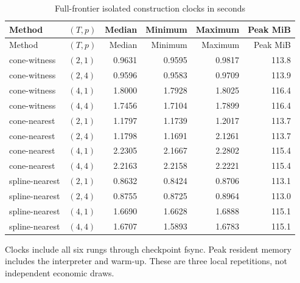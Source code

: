 \begin{longtable}{llrrrr}
\caption{Full-frontier isolated construction clocks in seconds}\label{tab:witnesstime46}\\
\toprule Method & $(T,p)$ & Median & Minimum & Maximum & Peak MiB \\ \midrule\endfirsthead
\toprule Method & $(T,p)$ & Median & Minimum & Maximum & Peak MiB \\ \midrule\endhead
cone-witness & $(2,1)$ & 0.9631 & 0.9595 & 0.9817 & 113.8 \\
cone-witness & $(2,4)$ & 0.9596 & 0.9583 & 0.9709 & 113.9 \\
cone-witness & $(4,1)$ & 1.8000 & 1.7928 & 1.8025 & 116.4 \\
cone-witness & $(4,4)$ & 1.7456 & 1.7104 & 1.7899 & 116.4 \\
cone-nearest & $(2,1)$ & 1.1797 & 1.1739 & 1.2017 & 113.7 \\
cone-nearest & $(2,4)$ & 1.1798 & 1.1691 & 2.1261 & 113.7 \\
cone-nearest & $(4,1)$ & 2.2305 & 2.1667 & 2.2802 & 115.4 \\
cone-nearest & $(4,4)$ & 2.2163 & 2.2158 & 2.2221 & 115.4 \\
spline-nearest & $(2,1)$ & 0.8632 & 0.8424 & 0.8706 & 113.1 \\
spline-nearest & $(2,4)$ & 0.8755 & 0.8725 & 0.8964 & 113.0 \\
spline-nearest & $(4,1)$ & 1.6690 & 1.6628 & 1.6888 & 115.1 \\
spline-nearest & $(4,4)$ & 1.6707 & 1.5893 & 1.6783 & 115.1 \\
\bottomrule\end{longtable}
Clocks include all six rungs through checkpoint fsync. Peak resident memory includes the interpreter and warm-up. These are three local repetitions, not independent economic draws.
